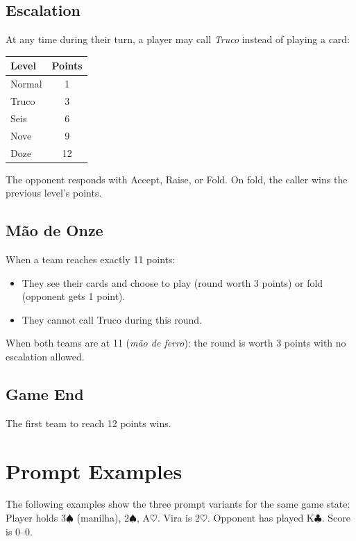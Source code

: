 \subsection{Escalation}

At any time during their turn, a player may call \emph{Truco} instead of playing a card:

\begin{center}
\begin{tabular}{lc}
\toprule
Level & Points \\
\midrule
Normal & 1 \\
Truco & 3 \\
Seis & 6 \\
Nove & 9 \\
Doze & 12 \\
\bottomrule
\end{tabular}
\end{center}

The opponent responds with Accept, Raise, or Fold. On fold, the caller wins the previous level's points.

\subsection{M\~{a}o de Onze}

When a team reaches exactly 11 points:
\begin{itemize}
    \item They see their cards and choose to play (round worth 3 points) or fold (opponent gets 1 point).
    \item They cannot call Truco during this round.
\end{itemize}

When both teams are at 11 (\emph{m\~{a}o de ferro}): the round is worth 3 points with no escalation allowed.

\subsection{Game End}

The first team to reach 12 points wins.

\section{Prompt Examples}
\label{app:prompts}

The following examples show the three prompt variants for the same game state: Player holds 3$\spadesuit$ (manilha), 2$\spadesuit$, A$\heartsuit$. Vira is 2$\heartsuit$. Opponent has played K$\clubsuit$. Score is 0--0.

